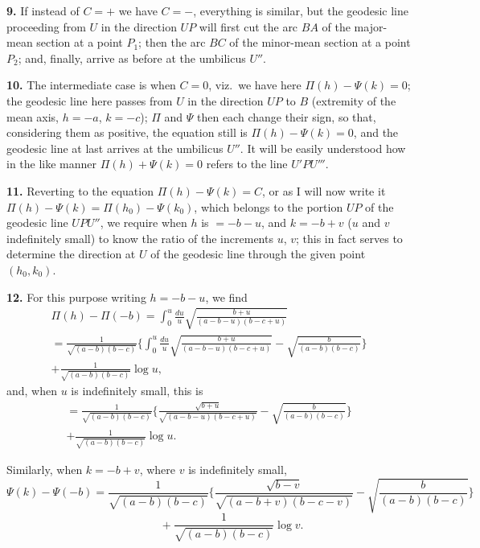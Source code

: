 \documentclass[11pt,a4paper]{article}
\begin{document}
\noindent\textbf{9.} If instead of $C = +$ we have $C = -$, everything is similar, but the geodesic line proceeding from $U$ in the direction $UP$ will first cut the arc $BA$ of the major-mean section at a point $P_{1}$; then the arc $BC$ of the minor-mean section at a point $P_{2}$; and, finally, arrive as before at the umbilicus $U''$.

\noindent\textbf{10.} The intermediate case is when $C = 0$, viz.\ we have here $\Pi(h) - \Psi(k) = 0$; the geodesic line here passes from $U$ in the direction $UP$ to $B$ (extremity of the mean axis, $h = -a$, $k = -c$); $\Pi$ and $\Psi$ then each change their sign, so that, considering them as positive, the equation still is $\Pi(h) - \Psi(k) = 0$, and the geodesic line at last arrives at the umbilicus $U''$. It will be easily understood how in the like manner $\Pi(h) + \Psi(k) = 0$ refers to the line $U'PU'''$.

\noindent\textbf{11.} Reverting to the equation $\Pi(h) - \Psi(k) = C$, or as I will now write it $\Pi(h) - \Psi(k) = \Pi(h_{0}) - \Psi(k_{0})$, which belongs to the portion $UP$ of the geodesic line $UPU''$, we require when $h$ is $= -b - u$, and $k = -b + v$ ($u$ and $v$ indefinitely small) to know the ratio of the increments $u$, $v$; this in fact serves to determine the direction at $U$ of the geodesic line through the given point $(h_{0}, k_{0})$.

\noindent\textbf{12.} For this purpose writing $h = -b - u$, we find
\begin{multline*}
\Pi(h) - \Pi(-b) = \int_{0}^{u} \frac{du}{u} \sqrt{\frac{b+u}{(a-b-u)(b-c+u)}} \\
= \frac{1}{\sqrt{(a-b)(b-c)}} \Bigg\{ \int_{0}^{u} \frac{du}{u} \sqrt{\frac{b+u}{(a-b-u)(b-c+u)}} - \sqrt{\frac{b}{(a-b)(b-c)}} \Bigg\} \\
+ \frac{1}{\sqrt{(a-b)(b-c)}} \log u,
\end{multline*}
and, when $u$ is indefinitely small, this is
\begin{multline*}
= \frac{1}{\sqrt{(a-b)(b-c)}} \Bigg\{ \frac{\sqrt{b+u}}{\sqrt{(a-b-u)(b-c+u)}} - \sqrt{\frac{b}{(a-b)(b-c)}} \Bigg\} \\
+ \frac{1}{\sqrt{(a-b)(b-c)}} \log u.
\end{multline*}

Similarly, when $k = -b + v$, where $v$ is indefinitely small,
\[
\Psi(k) - \Psi(-b) = \frac{1}{\sqrt{(a-b)(b-c)}} \Bigg\{ \frac{\sqrt{b-v}}{\sqrt{(a-b+v)(b-c-v)}} - \sqrt{\frac{b}{(a-b)(b-c)}} \Bigg\}
\]
\[
\qquad \qquad + \frac{1}{\sqrt{(a-b)(b-c)}} \log v.
\]
\end{document}

